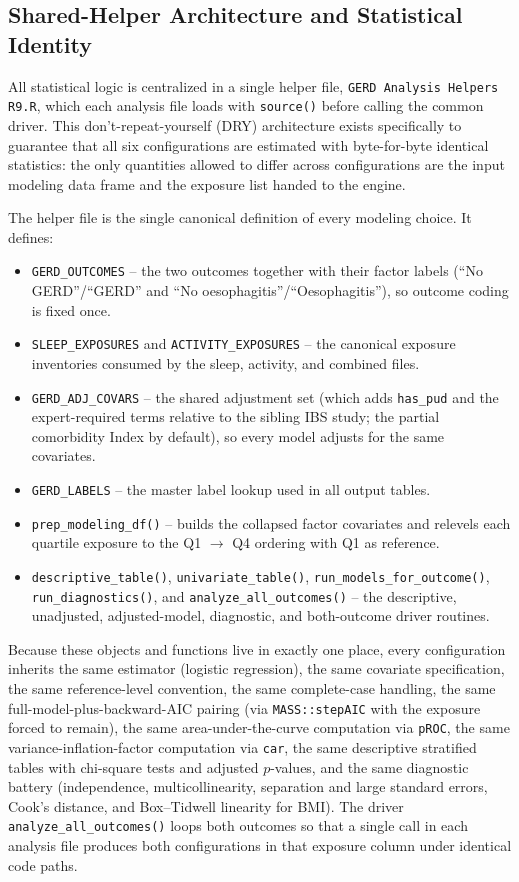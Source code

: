 \documentclass[11pt]{article}
\newcommand{\code}[1]{\texttt{\small #1}}
\begin{document}
\subsection{Shared-Helper Architecture and Statistical Identity}
\label{sec:model-not-here}

All statistical logic is centralized in a single helper file, \code{GERD Analysis Helpers R9.R}, which
each analysis file loads with \code{source()} before calling the common driver. This
don't-repeat-yourself (DRY) architecture exists specifically to guarantee that all six configurations
are estimated with byte-for-byte identical statistics: the only quantities allowed to differ across
configurations are the input modeling data frame and the exposure list handed to the engine.

The helper file is the single canonical definition of every modeling choice. It defines:

\begin{itemize}
  \item \code{GERD_OUTCOMES} -- the two outcomes together with their factor labels
    (``No GERD''/``GERD'' and ``No oesophagitis''/``Oesophagitis''), so outcome coding is fixed once.
  \item \code{SLEEP_EXPOSURES} and \code{ACTIVITY_EXPOSURES} -- the canonical exposure inventories
    consumed by the sleep, activity, and combined files.
  \item \code{GERD_ADJ_COVARS} -- the shared adjustment set (which adds \code{has_pud} and
    the expert-required terms relative to the sibling IBS study; the partial comorbidity
    Index by default), so every model adjusts for the same covariates.
  \item \code{GERD_LABELS} -- the master label lookup used in all output tables.
  \item \code{prep_modeling_df()} -- builds the collapsed factor covariates and relevels each
    quartile exposure to the Q1 $\rightarrow$ Q4 ordering with Q1 as reference.
  \item \code{descriptive_table()}, \code{univariate_table()}, \code{run_models_for_outcome()},
    \code{run_diagnostics()}, and \code{analyze_all_outcomes()} -- the descriptive, unadjusted,
    adjusted-model, diagnostic, and both-outcome driver routines.
\end{itemize}

Because these objects and functions live in exactly one place, every configuration inherits the same
estimator (logistic regression), the same covariate specification, the same reference-level
convention, the same complete-case handling, the same full-model-plus-backward-AIC pairing (via
\code{MASS::stepAIC} with the exposure forced to remain), the same area-under-the-curve computation
via \code{pROC}, the same variance-inflation-factor computation via \code{car}, the same descriptive
stratified tables with chi-square tests and adjusted $p$-values, and the same diagnostic battery
(independence, multicollinearity, separation and large standard errors, Cook's distance, and
Box--Tidwell linearity for BMI). The driver \code{analyze_all_outcomes()} loops both outcomes so that
a single call in each analysis file produces both configurations in that exposure column under
identical code paths.
\end{document}
